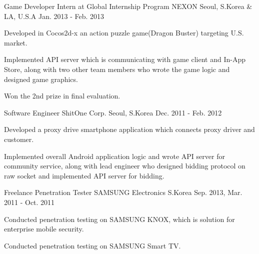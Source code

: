 \begin{cventries}
  \cventry
    {Game Developer Intern at Global Internship Program} %
    {NEXON} %
    {Seoul, S.Korea \& LA, U.S.A} %
    {Jan. 2013 - Feb. 2013} %
    {
      \begin{cvitems} %
        \item {Developed in Cocos2d-x an action puzzle game(Dragon Buster) targeting U.S. market.}
        \item {Implemented API server which is communicating with game client and In-App Store, along with two other team members who wrote the game logic and designed game graphics.}
        \item {Won the 2nd prize in final evaluation.}
      \end{cvitems}
    }

  \cventry
    {Software Engineer} %
    {ShitOne Corp.} %
    {Seoul, S.Korea} %
    {Dec. 2011 - Feb. 2012} %
    {
      \begin{cvitems} %
        \item {Developed a proxy drive smartphone application which connects proxy driver and customer.}
        \item {Implemented overall Android application logic and wrote API server for community service, along with lead engineer who designed bidding protocol on raw socket and implemented API server for bidding.}
      \end{cvitems}
    }

  \cventry
    {Freelance Penetration Tester} %
    {SAMSUNG Electronics} %
    {S.Korea} %
    {Sep. 2013, Mar. 2011 - Oct. 2011} %
    {
      \begin{cvitems} %
        \item {Conducted penetration testing on SAMSUNG KNOX, which is solution for enterprise mobile security.}
        \item {Conducted penetration testing on SAMSUNG Smart TV.}
      \end{cvitems}
    }

\end{cventries}
